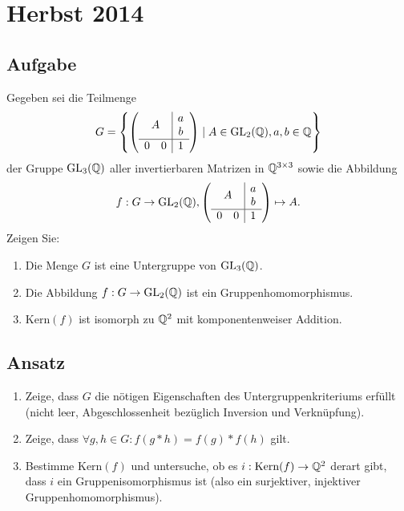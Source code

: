 \section{Herbst 2014}

\subsection{Aufgabe}
Gegeben sei die Teilmenge
\begin{equation*}
	G = \left \{ \left( 
	\begin{array}{cc|c}
		\multicolumn{2}{c|}{\multirow{2}{*}{\( A \)}} & a \\
		\multicolumn{2}{c|}{} & b \\
		\hline 
		0 & 0 & 1
	\end{array}
	 \right) \mid A \in \text{GL}_2(\Q), a,b \in \Q \right \}
\end{equation*}
der Gruppe \( \text{GL}_3(\mathbb{Q}) \) aller invertierbaren Matrizen in \( \mathbb{Q}^{3 \times 3} \) sowie die Abbildung
\begin{equation*}
	f: G \to \text{GL}_2(\Q), \left( 
	\begin{array}{cc|c}
		\multicolumn{2}{c|}{\multirow{2}{*}{\( A \)}} & a \\
		\multicolumn{2}{c|}{} & b \\
		\hline 
		0 & 0 & 1
	\end{array}
	 \right) \mapsto A\text{.}
\end{equation*}
Zeigen Sie: 
\begin{enumerate}
	\item Die Menge \( G \) ist eine Untergruppe von \( \text{GL}_3(\mathbb{Q}) \).
	\item Die Abbildung \( f: G \to \text{GL}_2(\mathbb{Q}) \) ist ein Gruppenhomomorphismus.
	\item \( \text{Kern}(f) \) ist isomorph zu \( \mathbb{Q}^2 \) mit komponentenweiser Addition. 
\end{enumerate}

\subsection{Ansatz}
\begin{enumerate}
	\item Zeige, dass \( G \) die nötigen Eigenschaften des Untergruppenkriteriums erfüllt (nicht leer, Abgeschlossenheit bezüglich Inversion und Verknüpfung).
	\item Zeige, dass \( \forall g,h \in G: f(g*h) = f(g)*f(h) \) gilt.
	\item Bestimme \( \text{Kern}(f) \) und untersuche, ob es \( i: \text{Kern}(f) \to \mathbb{Q}^2 \) derart gibt, dass \( i \) ein Gruppenisomorphismus ist (also ein surjektiver, injektiver Gruppenhomomorphismus).
\end{enumerate}

